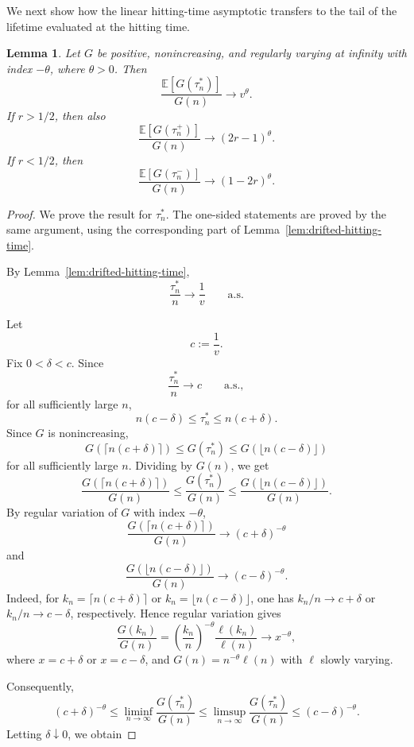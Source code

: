 \documentclass[reqno,final,11pt]{amsart}
\newcommand{\E}{\mathbb E}
\theoremstyle{plain}
\newtheorem{lemma}[theorem]{Lemma}
\theoremstyle{definition}
\theoremstyle{remark}
\numberwithin{equation}{section}
\begin{document}
We next show how the linear hitting-time asymptotic transfers to the tail of
the lifetime evaluated at the hitting time.

\begin{lemma}\label{lem:transfer-drift}
Let \(G\) be positive, nonincreasing, and regularly varying at infinity with
index \(-\theta\), where \(\theta>0\). Then
\[
  \frac{\E[G(\tau_n^*)]}{G(n)}
  \longrightarrow
  v^\theta.
\]
If \(r>1/2\), then also
\[
  \frac{\E[G(\tau_n^+)]}{G(n)}
  \longrightarrow
  (2r-1)^\theta.
\]
If \(r<1/2\), then
\[
  \frac{\E[G(\tau_n^-)]}{G(n)}
  \longrightarrow
  (1-2r)^\theta.
\]
\end{lemma}

\begin{proof}
We prove the result for \(\tau_n^*\). The one-sided statements are proved by
the same argument, using the corresponding part of
Lemma~\ref{lem:drifted-hitting-time}.

By Lemma~\ref{lem:drifted-hitting-time},
\[
  \frac{\tau_n^*}{n}
  \longrightarrow
  \frac1v
  \qquad\text{a.s.}
\]


Let
\[
  c:=\frac1v.
\]
Fix \(0<\delta<c\). Since
\[
  \frac{\tau_n^*}{n}\longrightarrow c
  \qquad\text{a.s.},
\]
for all sufficiently large \(n\),
\[
  n(c-\delta)\le \tau_n^*\le n(c+\delta).
\]
Since \(G\) is nonincreasing,
\[
  G(\lceil n(c+\delta)\rceil)
  \le
  G(\tau_n^*)
  \le
  G(\lfloor n(c-\delta)\rfloor)
\]
for all sufficiently large \(n\). Dividing by \(G(n)\), we get
\[
  \frac{G(\lceil n(c+\delta)\rceil)}{G(n)}
  \le
  \frac{G(\tau_n^*)}{G(n)}
  \le
  \frac{G(\lfloor n(c-\delta)\rfloor)}{G(n)}.
\]
By regular variation of \(G\) with index \(-\theta\),
\[
  \frac{G(\lceil n(c+\delta)\rceil)}{G(n)}
  \longrightarrow
  (c+\delta)^{-\theta}
\]
and
\[
  \frac{G(\lfloor n(c-\delta)\rfloor)}{G(n)}
  \longrightarrow
  (c-\delta)^{-\theta}.
\]
Indeed, for \(k_n=\lceil n(c+\delta)\rceil\) or
\(k_n=\lfloor n(c-\delta)\rfloor\), one has \(k_n/n\to c+\delta\) or
\(k_n/n\to c-\delta\), respectively. Hence regular variation gives
\[
  \frac{G(k_n)}{G(n)}
  =
  \left(\frac{k_n}{n}\right)^{-\theta}
  \frac{\ell(k_n)}{\ell(n)}
  \longrightarrow
  x^{-\theta},
\]
where \(x=c+\delta\) or \(x=c-\delta\), and \(G(n)=n^{-\theta}\ell(n)\) with
\(\ell\) slowly varying.

Consequently,
\[
  (c+\delta)^{-\theta}
  \le
  \liminf_{n\to\infty}\frac{G(\tau_n^*)}{G(n)}
  \le
  \limsup_{n\to\infty}\frac{G(\tau_n^*)}{G(n)}
  \le
  (c-\delta)^{-\theta}.
\]
Letting \(\delta\downarrow0\), we obtain


\end{proof}
\end{document}

